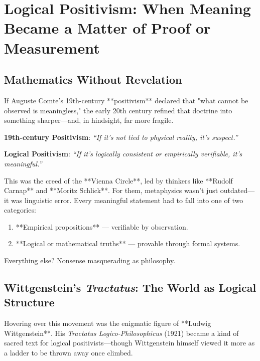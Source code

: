 
\section{Logical Positivism: When Meaning Became a Matter of Proof or Measurement}


\subsection{Mathematics Without Revelation}
If Auguste Comte’s 19th-century **positivism** declared that "what cannot be observed is meaningless," the early 20th century refined that doctrine into something sharper—and, in hindsight, far more fragile.

\begin{tcolorbox}[colback=gray!5!white, colframe=black!75!white, title={From Comte to Carnap: The Evolution of Positivism}]
\textbf{19th-century Positivism}:  
\textit{“If it’s not tied to physical reality, it’s suspect.”}

\textbf{Logical Positivism}:  
\textit{“If it’s logically consistent or empirically verifiable, it’s meaningful.”}
\end{tcolorbox}

This was the creed of the **Vienna Circle**, led by thinkers like **Rudolf Carnap** and **Moritz Schlick**. For them, metaphysics wasn’t just outdated—it was linguistic error. Every meaningful statement had to fall into one of two categories:

\begin{enumerate}
    \item **Empirical propositions** — verifiable by observation.
    \item **Logical or mathematical truths** — provable through formal systems.
\end{enumerate}

Everything else? Nonsense masquerading as philosophy.

\subsection{Wittgenstein’s \textit{Tractatus}: The World as Logical Structure}

Hovering over this movement was the enigmatic figure of **Ludwig Wittgenstein**. His \textit{Tractatus Logico-Philosophicus} (1921) became a kind of sacred text for logical positivists—though Wittgenstein himself viewed it more as a ladder to be thrown away once climbed.


